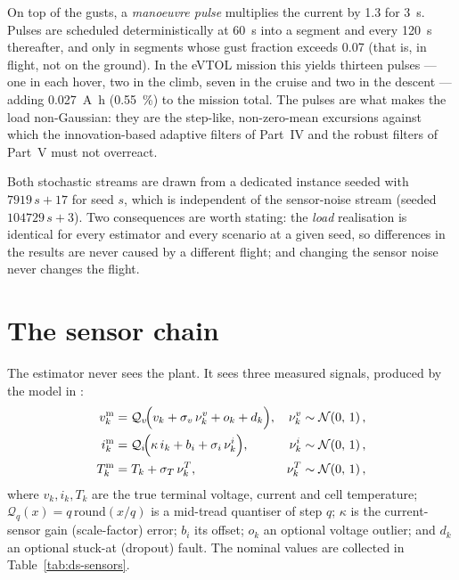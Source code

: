 On top of the gusts, a \emph{manoeuvre pulse} multiplies the current by \num{1.3} for
\SI{3}{\second}. Pulses are scheduled deterministically at \SI{60}{\second} into a segment and
every \SI{120}{\second} thereafter, and only in segments whose gust fraction exceeds \num{0.07}
(that is, in flight, not on the ground). In the eVTOL mission this yields thirteen pulses --- one
in each hover, two in the climb, seven in the cruise and two in the descent --- adding
\SI{0.027}{\ampere\hour} (\SI{0.55}{\percent}) to the mission total. The pulses are what makes the
load non-Gaussian: they are the step-like, non-zero-mean excursions against which the
innovation-based adaptive filters of Part~IV and the robust filters of Part~V must not overreact.

Both stochastic streams are drawn from a dedicated  instance seeded with
$7919\,s + 17$ for seed $s$, which is independent of the sensor-noise stream (seeded
$104729\,s+3$). Two consequences are worth stating: the \emph{load} realisation is identical for
every estimator and every scenario at a given seed, so differences in the results are never caused
by a different flight; and changing the sensor noise never changes the flight.

\section{The sensor chain}
\label{sec:ds-sensors}

The estimator never sees the plant. It sees three measured signals, produced by the model in
:
\begin{align}
v^{\text{m}}_k &= \mathcal{Q}_{v}\!\Bigl(v_k + \sigma_v\,\nu^v_k + o_k + d_k\Bigr),
 & \nu^v_k &\sim \mathcal{N}\!\left(0,\,1\right), \label{eq:ds-vmeas}\\
i^{\text{m}}_k &= \mathcal{Q}_{i}\!\Bigl(\kappa\, i_k + b_i + \sigma_i\,\nu^i_k\Bigr),
 & \nu^i_k &\sim \mathcal{N}\!\left(0,\,1\right), \label{eq:ds-imeas}\\
T^{\text{m}}_k &= T_k + \sigma_T\,\nu^T_k, & \nu^T_k &\sim \mathcal{N}\!\left(0,\,1\right), \label{eq:ds-tmeas}
\end{align}
where $v_k, i_k, T_k$ are the true terminal voltage, current and cell temperature;
$\mathcal{Q}_q(x) = q\,\mathrm{round}(x/q)$ is a mid-tread quantiser of step $q$;
$\kappa$ is the current-sensor gain (scale-factor) error; $b_i$ its offset;
$o_k$ an optional voltage outlier; and $d_k$ an optional stuck-at (dropout) fault. The nominal
values are collected in Table~\ref{tab:ds-sensors}.

